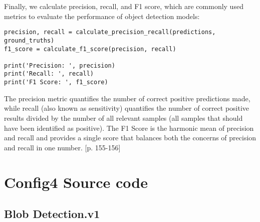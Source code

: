 Finally, we calculate precision, recall, and F1 score, which are commonly used metrics to evaluate the performance of object detection models:

\begin{lstlisting}[language=PythonPlus]
precision, recall = calculate_precision_recall(predictions, ground_truths)
f1_score = calculate_f1_score(precision, recall)

print('Precision: ', precision)
print('Recall: ', recall)
print('F1 Score: ', f1_score)
\end{lstlisting}

The precision metric quantifies the number of correct positive predictions made, while recall (also known as sensitivity) quantifies the number of correct positive results divided by the number of all relevant samples (all samples that should have been identified as positive). The F1 Score is the harmonic mean of precision and recall and provides a single score that balances both the concerns of precision and recall in one number. \cite{preandrec}[p. 155-156]









\chapter{Config4 Source code}
\section{Blob Detection.v1}

